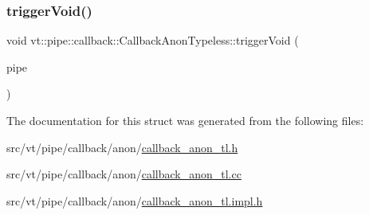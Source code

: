 \subsubsection{\texorpdfstring{trigger\+Void()}{triggerVoid()}}
{\footnotesize\ttfamily void vt\+::pipe\+::callback\+::\+Callback\+Anon\+Typeless\+::trigger\+Void (\begin{DoxyParamCaption}\item[{\hyperlink{namespacevt_ac9852acda74d1896f48f406cd72c7bd3}{Pipe\+Type} const \&}]{pipe }\end{DoxyParamCaption})}



The documentation for this struct was generated from the following files\+:\begin{DoxyCompactItemize}
\item 
src/vt/pipe/callback/anon/\hyperlink{callback__anon__tl_8h}{callback\+\_\+anon\+\_\+tl.\+h}\item 
src/vt/pipe/callback/anon/\hyperlink{callback__anon__tl_8cc}{callback\+\_\+anon\+\_\+tl.\+cc}\item 
src/vt/pipe/callback/anon/\hyperlink{callback__anon__tl_8impl_8h}{callback\+\_\+anon\+\_\+tl.\+impl.\+h}\end{DoxyCompactItemize}

